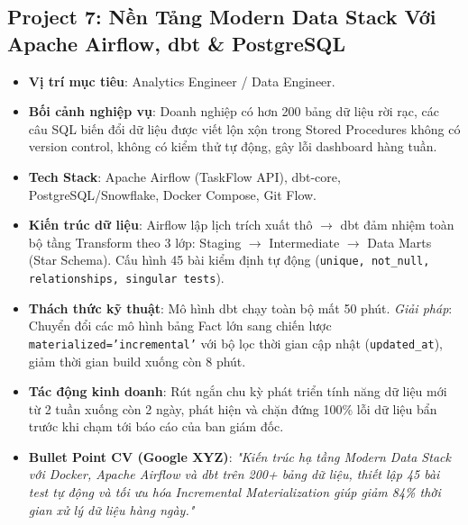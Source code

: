 \subsection{Project 7: Nền Tảng Modern Data Stack Với Apache Airflow, dbt \& PostgreSQL}
\begin{itemize}
    \item \textbf{Vị trí mục tiêu}: Analytics Engineer / Data Engineer.
    \item \textbf{Bối cảnh nghiệp vụ}: Doanh nghiệp có hơn 200 bảng dữ liệu rời rạc, các câu SQL biến đổi dữ liệu được viết lộn xộn trong Stored Procedures không có version control, không có kiểm thử tự động, gây lỗi dashboard hàng tuần.
    \item \textbf{Tech Stack}: Apache Airflow (TaskFlow API), dbt-core, PostgreSQL/Snowflake, Docker Compose, Git Flow.
    \item \textbf{Kiến trúc dữ liệu}: Airflow lập lịch trích xuất thô $\rightarrow$ dbt đảm nhiệm toàn bộ tầng Transform theo 3 lớp: Staging $\rightarrow$ Intermediate $\rightarrow$ Data Marts (Star Schema). Cấu hình 45 bài kiểm định tự động (\texttt{unique, not\_null, relationships, singular tests}).
    \item \textbf{Thách thức kỹ thuật}: Mô hình dbt chạy toàn bộ mất 50 phút. \textit{Giải pháp}: Chuyển đổi các mô hình bảng Fact lớn sang chiến lược \texttt{materialized='incremental'} với bộ lọc thời gian cập nhật (\texttt{updated\_at}), giảm thời gian build xuống còn 8 phút.
    \item \textbf{Tác động kinh doanh}: Rút ngắn chu kỳ phát triển tính năng dữ liệu mới từ 2 tuần xuống còn 2 ngày, phát hiện và chặn đứng 100\% lỗi dữ liệu bẩn trước khi chạm tới báo cáo của ban giám đốc.
    \item \textbf{Bullet Point CV (Google XYZ)}: \textit{"Kiến trúc hạ tầng Modern Data Stack với Docker, Apache Airflow và dbt trên 200+ bảng dữ liệu, thiết lập 45 bài test tự động và tối ưu hóa Incremental Materialization giúp giảm 84\% thời gian xử lý dữ liệu hàng ngày."}
\end{itemize}

